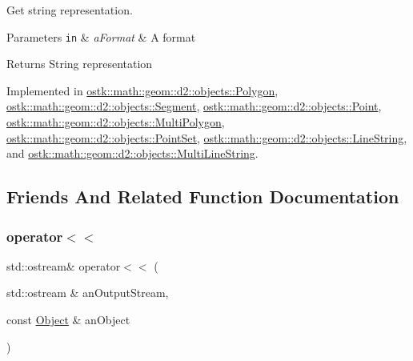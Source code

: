Get string representation. 


\begin{DoxyParams}[1]{Parameters}
\mbox{\tt in}  & {\em a\+Format} & A format \\
\hline
\end{DoxyParams}
\begin{DoxyReturn}{Returns}
String representation 
\end{DoxyReturn}


Implemented in \hyperlink{classostk_1_1math_1_1geom_1_1d2_1_1objects_1_1_polygon_a6e672ccf5f1101de80e636f097f0a0f7}{ostk\+::math\+::geom\+::d2\+::objects\+::\+Polygon}, \hyperlink{classostk_1_1math_1_1geom_1_1d2_1_1objects_1_1_segment_ac302430065e10f1f281bb8782a904673}{ostk\+::math\+::geom\+::d2\+::objects\+::\+Segment}, \hyperlink{classostk_1_1math_1_1geom_1_1d2_1_1objects_1_1_point_ac8fdaee79af60e2972257e43ff175f12}{ostk\+::math\+::geom\+::d2\+::objects\+::\+Point}, \hyperlink{classostk_1_1math_1_1geom_1_1d2_1_1objects_1_1_multi_polygon_abf52343dc62ec2d62d971bef636f6c1c}{ostk\+::math\+::geom\+::d2\+::objects\+::\+Multi\+Polygon}, \hyperlink{classostk_1_1math_1_1geom_1_1d2_1_1objects_1_1_point_set_af032e86d9d9dcabe229a015a8361daf2}{ostk\+::math\+::geom\+::d2\+::objects\+::\+Point\+Set}, \hyperlink{classostk_1_1math_1_1geom_1_1d2_1_1objects_1_1_line_string_a5312030bced48de68f8902bb6581461d}{ostk\+::math\+::geom\+::d2\+::objects\+::\+Line\+String}, and \hyperlink{classostk_1_1math_1_1geom_1_1d2_1_1objects_1_1_multi_line_string_a87df673d41e16eb2b196c8b8a852d71f}{ostk\+::math\+::geom\+::d2\+::objects\+::\+Multi\+Line\+String}.



\subsection{Friends And Related Function Documentation}
\mbox{\label{classostk_1_1math_1_1geom_1_1d2_1_1_object_a418df9bf4a73078f3d494edef1743f8d}} 
\subsubsection{\texorpdfstring{operator$<$$<$}{operator<<}}
{\footnotesize\ttfamily std\+::ostream\& operator$<$$<$ (\begin{DoxyParamCaption}\item[{std\+::ostream \&}]{an\+Output\+Stream,  }\item[{const \hyperlink{classostk_1_1math_1_1geom_1_1d2_1_1_object}{Object} \&}]{an\+Object }\end{DoxyParamCaption})\hspace{0.3cm}{\ttfamily [friend]}}



